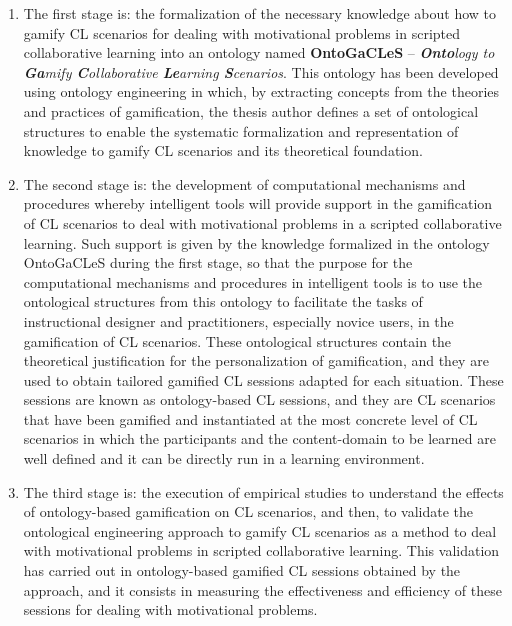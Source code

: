 \begin{enumerate}
\item
The first stage is: the formalization of the necessary knowledge about how to gamify CL scenarios for dealing with motivational problems in scripted collaborative learning into an ontology named \textbf{OntoGaCLeS} – \emph{\textbf{Onto}logy to \textbf{Ga}mify \textbf{C}ollaborative \textbf{Le}arning \textbf{S}cenarios}.
This ontology has been developed using ontology engineering in which, by extracting concepts from the theories and practices of gamification, the thesis author defines a set of ontological structures to enable the systematic formalization and representation of knowledge to gamify CL scenarios and its theoretical foundation.

\item
The second stage is: the development of computational mechanisms and procedures whereby intelligent tools will provide support in the gamification of CL scenarios to deal with motivational problems in a scripted collaborative learning.
Such support is given by the knowledge formalized in the ontology OntoGaCLeS during the first stage, so that the purpose for the computational mechanisms and procedures in intelligent tools is to use the ontological structures from this ontology to facilitate the tasks of instructional designer and practitioners, especially novice users, in the gamification of CL scenarios.
These ontological structures contain the theoretical justification for the personalization of gamification, and they are used to obtain tailored gamified CL sessions adapted for each situation.
These sessions are known as ontology-based CL sessions, and they are CL scenarios that have been gamified and instantiated at the most concrete level of CL scenarios in which the participants and the content-domain to be learned are well defined and it can be directly run in a learning environment.

\item
The third stage is: the execution of empirical studies to understand the effects of ontology-based gamification on CL scenarios, and then, to validate the ontological engineering approach to gamify CL scenarios as a method to deal with motivational problems in scripted collaborative learning.
This validation has carried out in ontology-based gamified CL sessions obtained by the approach, and it consists in measuring the effectiveness and efficiency of these sessions for dealing with motivational problems.
\end{enumerate}

